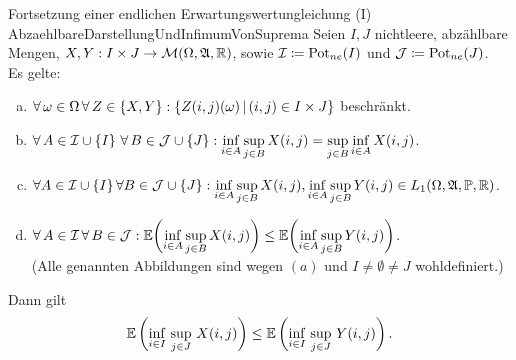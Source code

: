 \begin{satz}{Fortsetzung einer endlichen Erwartungswertungleichung (I)}
            {AbzaehlbareDarstellungUndInfimumVonSuprema}
Seien $I, J$ nichtleere, abzählbare Mengen,
$X, Y: I\times J \rightarrow \mathcal{M}(\Omega, \mathfrak{A}, \mathbb{R})$, sowie
$\mathcal{I} \coloneqq  \mathop{\textrm{Pot}}\nolimits_{ne}(I)$ und $\mathcal{J} \coloneqq  \mathop{\textrm{Pot}}\nolimits_{ne}(J)$.\\
Es gelte:
\begin{enumerate}[(a)]
\item $\forall\,\omega\in\Omega\,\forall\, Z \in \left\{X, Y\right\}: 
      \left\{Z(i, j)(\omega)\,|\,(i, j)\in I\times J\right\}$
      beschränkt.
\item $\forall\, A \in \mathcal{I} \cup \left\{I\right\} \, \forall\, B \in \mathcal{J} \cup \left\{J\right\}:
     \underset{i \in A}\inf\,\underset{j \in B}\sup\, X(i, j) = \underset{j \in B}\sup\,\underset{i \in A}\inf\, X(i,j)$.
\item $\forall A \in \mathcal{I} \cup \left\{I\right\}  \forall B \in \mathcal{J} \cup \left\{J\right\}:
     \underset{i \in A}\inf\,\underset{j \in B}\sup\, X(i, j), \underset{i \in A}\inf\,\underset{j \in B}\sup\, Y(i, j)
     \in L_1(\Omega, \mathfrak{A}, \mathbb{P}, \mathbb{R})$.   
\item $\forall\, A \in \mathcal{I} \, \forall\, B \in \mathcal{J}:
\mathbb{E}\bigg(\underset{i \in A}\inf\,\underset{j \in B}\sup\, X(i, j) \bigg)
\le \mathbb{E}\bigg(\underset{i \in A}\inf\,\underset{j \in B}\sup\, Y(i, j) \bigg)$.\\
(Alle genannten Abbildungen sind wegen $(a)$ und $I \neq \emptyset \neq J$
 wohldefiniert.)
\end{enumerate}
Dann gilt \[\mathbb{E}\left(\inf_{i \in I}\,\sup_{j \in J}\, X(i, j) \right)
\le \mathbb{E}\left(\inf_{i \in I}\,\sup_{j \in J}\, Y(i, j) \right)\text.\]
\end{satz}
